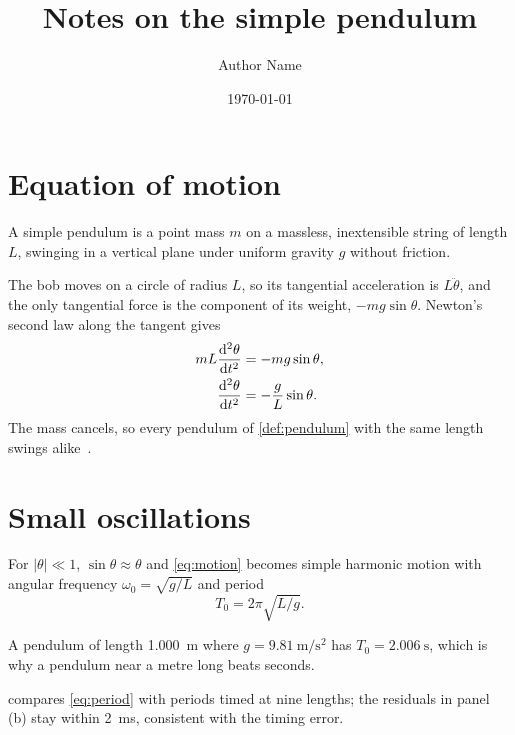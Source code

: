 \documentclass[11pt]{article}
\title{Notes on the simple pendulum}
\author{Author Name}
\date{\today}
\begin{document}
\maketitle

\tableofcontents

\section{Equation of motion}

\begin{definition}
  A simple pendulum is a point mass $m$ on a massless, inextensible string of length $L$, swinging in a vertical plane under uniform gravity $g$ without friction.
  \label{def:pendulum}
\end{definition}

The bob moves on a circle of radius $L$, so its tangential acceleration is $L \ddot\theta$, and the only tangential force is the component of its weight, $-mg \sin\theta$. Newton's second law along the tangent gives
\begin{align}
  m L \frac{\mathop{}\!\mathrm{d}^2\theta}{\mathop{}\!\mathrm{d} t^2} &= -m g \sin\theta , \notag \\
  \frac{\mathop{}\!\mathrm{d}^2\theta}{\mathop{}\!\mathrm{d} t^2} &= -\frac{g}{L} \sin\theta .
  \label{eq:motion}
\end{align}
The mass cancels, so every pendulum of \cref{def:pendulum} with the same length swings alike~\cite{nelson1986}.

\section{Small oscillations}

For $|\theta| \ll 1$, $\sin\theta \approx \theta$ and \cref{eq:motion} becomes simple harmonic motion with angular frequency $\omega_0 = \sqrt{g/L}$ and period
\begin{equation}
  T_0 = 2\pi \sqrt{L/g} .
  \label{eq:period}
\end{equation}

\begin{example}
  A pendulum of length \qty{1.000}{\metre} where $g = \qty{9.81}{\metre\per\second\squared}$ has $T_0 = \qty{2.006}{\second}$, which is why a pendulum near a metre long beats seconds.
\end{example}

 compares \cref{eq:period} with periods timed at nine lengths; the residuals in panel (b) stay within \qty{2}{\milli\second}, consistent with the timing error.
\end{document}
